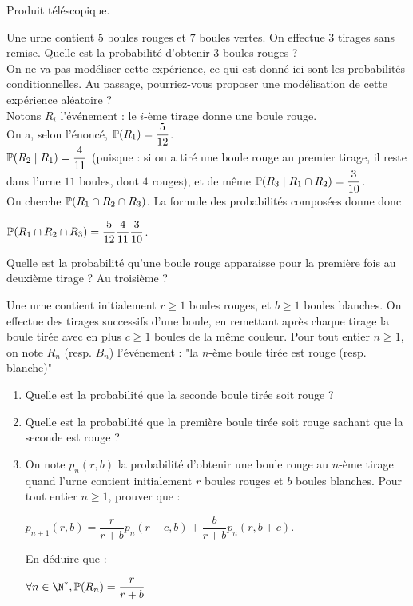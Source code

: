 \documentclass[12pt,a4paper]{report}
\begin{document}
\begin{demo}{}
Produit téléscopique.
\end{demo}

\begin{exemple}{}
Une urne contient $5$ boules rouges et $7$ boules vertes. On effectue $3$ tirages sans remise. Quelle est la probabilité d'obtenir $3$ boules rouges ? \\

On ne va pas modéliser cette expérience, ce qui est donné ici sont les probabilités conditionnelles. Au passage, pourriez-vous proposer une modélisation de cette expérience aléatoire ? \\

Notons $R_i$ l'événement : le $i$-ème tirage donne une boule rouge. \\
On a, selon l'énoncé, $\mathbb{P}(R_1) = \dfrac{5}{12}$. \\

$\mathbb{P}(R_2 \mid R_1) = \dfrac{4}{11}$ (puisque : si on a tiré une boule rouge au premier tirage, il reste dans l'urne $11$ boules, dont $4$ rouges), et de même $\mathbb{P}(R_3 \mid R_1 \cap R_2) = \dfrac{3}{10}$. \\

On cherche $\mathbb{P}(R_1 \cap R_2 \cap R_3)$. La formule des probabilités composées donne donc
\begin{center}
$\mathbb{P}(R_1 \cap R_2 \cap R_3) = \dfrac{5}{12} \dfrac{4}{11} \dfrac{3}{10}$.
\end{center}

Quelle est la probabilité qu'une boule rouge apparaisse pour la première fois au deuxième tirage ? Au troisième ?
\end{exemple}

\begin{exemple}{}
Une urne contient initialement $r \ge 1$ boules rouges, et $b \ge 1$ boules blanches. On effectue des tirages successifs d'une boule, en remettant après chaque tirage la boule tirée avec en plus $c \ge 1$ boules de la même couleur. Pour tout entier $n \ge 1$, on note $R_n$ (resp. $B_n$) l'événement : "la $n$-ème boule tirée est rouge (resp. blanche)"
\begin{enumerate}
	\item Quelle est la probabilité que la seconde boule tirée soit rouge ?
	\item Quelle est la probabilité que la première boule tirée soit rouge sachant que la seconde est rouge ?
	\item On note $p_n(r,b)$ la probabilité d'obtenir une boule rouge au $n$-ème tirage quand l'urne contient initialement $r$ boules rouges et $b$ boules blanches. Pour tout entier $n \ge 1$, prouver que :
	\begin{center}
	$p_{n+1}(r,b) = \dfrac{r}{r+b} p_n(r+c,b) + \dfrac{b}{r+b} p_n(r,b+c)$. 
	\end{center}
	
	En déduire que :
	\begin{center}
	$\forall n \in \N^*, \p(R_n) = \dfrac{r}{r+b}$
	\end{center}
\end{enumerate}
\end{exemple}
\end{document}

